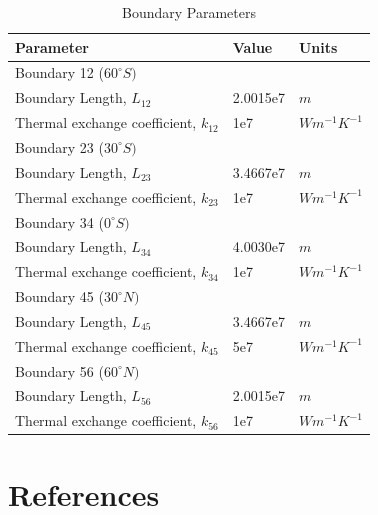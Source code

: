 \documentclass[12pt]{article}
\begin{document}
\begin{table}
    \captionsetup{singlelinecheck = false, justification=justified}
    \caption{Boundary Parameters}
    \begin{tabular}{lll}
    \hline
    Parameter & Value & Units\\
    \hline
    Boundary 12 ($60^{\circ}S)$ & & \\
    Boundary Length, $L_{12}$ & 2.0015e7 & $m$ \\
    Thermal exchange coefficient, $k_{12}$ & 1e7 & $Wm^{-1}K^{-1}$ \\ 
    Boundary 23 ($30^{\circ}S)$ & & \\
    Boundary Length, $L_{23}$ & 3.4667e7 & $m$ \\
    Thermal exchange coefficient, $k_{23}$ & 1e7 & $Wm^{-1}K^{-1}$ \\
    Boundary 34 ($0^{\circ}S)$ & & \\
    Boundary Length, $L_{34}$ & 4.0030e7 & $m$ \\
    Thermal exchange coefficient, $k_{34}$ & 1e7 & $Wm^{-1}K^{-1}$ \\ 
    Boundary 45 ($30^{\circ}N)$ & & \\
    Boundary Length, $L_{45}$ & 3.4667e7 & $m$ \\
    Thermal exchange coefficient, $k_{45}$ & 5e7 & $Wm^{-1}K^{-1}$ \\
    Boundary 56 ($60^{\circ}N)$ & & \\
    Boundary Length, $L_{56}$ & 2.0015e7 & $m$ \\
    Thermal exchange coefficient, $k_{56}$ & 1e7 & $Wm^{-1}K^{-1}$ \\
    \end{tabular}
    \label{tab:zoneparams}
\end{table}
\FloatBarrier

\newpage
\section{References}
\printbibliography
\end{document}
